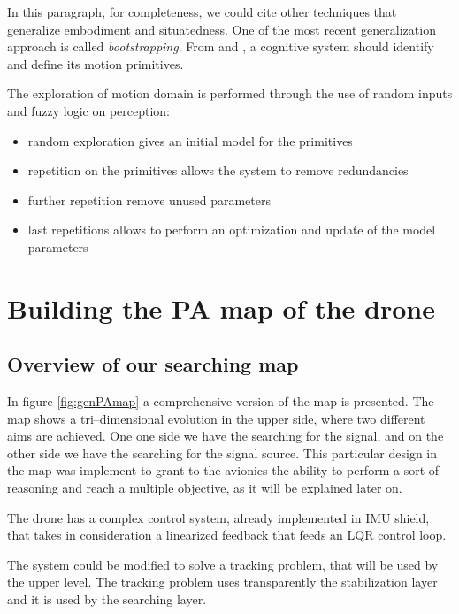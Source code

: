 In this paragraph, for completeness, we could cite other techniques that generalize embodiment and situatedness. One of the most recent generalization approach is called \emph{bootstrapping}. From \citep{sun2001implicit} and \citep{hierarchicalbootstrapping}, a cognitive system should identify and define its motion primitives. 

The exploration of motion domain is performed through the use of random inputs and fuzzy logic\citep{aframeworkforhierarchicalperceptionaction} on perception:
\begin{itemize}
\item random exploration gives an initial model for the primitives
\item repetition on the primitives allows the system to remove redundancies
\item further repetition remove unused parameters
\item last repetitions allows to perform an optimization and update of the model parameters
\end{itemize}

\section{Building the PA map of the drone}

\subsection{Overview of our searching map}

In figure \ref{fig:genPAmap} a comprehensive version of the map is presented. The map shows a tri--dimensional evolution in the upper side, where two different aims are achieved. One one side we have the searching for the signal, and on the other side we have the searching for the signal source. This particular design in the map was implement to grant to the avionics the ability to perform a sort of reasoning and reach a multiple objective, as it will be explained later on.

The drone has a complex control system, already implemented in IMU shield, that takes in consideration a linearized feedback that feeds an LQR control loop\citep{belanger1995control}. 

The system could be modified to solve a tracking problem, that will be used by the upper level. The tracking problem uses transparently the stabilization layer and it is used by the searching layer.

